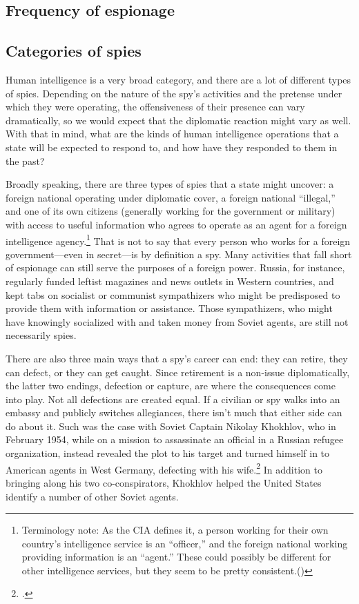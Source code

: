 \documentclass[11pt]{memoir}
\begin{document}
\begin{refsegment}
\section{Frequency of espionage}
\subsection{Categories of spies}
Human intelligence is a very broad category, and there are a lot of different types of spies. Depending on the nature of the spy's activities and the pretense under which they were operating, the offensiveness of their presence can vary dramatically, so we would expect that the diplomatic reaction might vary as well. With that in mind, what are the kinds of human intelligence operations that a state will be expected to respond to, and how have they responded to them in the past?

Broadly speaking, there are three types of spies that a state might uncover: a foreign national operating under diplomatic cover, a foreign national ``illegal,'' and one of its own citizens (generally working for the government or military) with access to useful information who agrees to operate as an agent for a foreign intelligence agency.\footnote{Terminology note: As the CIA defines it, a person working for their own country's intelligence service is an ``officer,'' and the foreign national working providing information is an ``agent.'' These could possibly be different for other intelligence services, but they seem to be pretty consistent.(\cite{cia_insider_2019})} That is not to say that every person who works for a foreign government---even in secret---is by definition a spy. Many activities that fall short of espionage can still serve the purposes of a foreign power. Russia, for instance, regularly funded leftist magazines and news outlets in Western countries, and kept tabs on socialist or communist sympathizers who might be predisposed to provide them with information or assistance. Those sympathizers, who might have knowingly socialized with and taken money from Soviet agents, are still not necessarily spies.

There are also three main ways that a spy's career can end: they can retire, they can defect, or they can get caught. Since retirement is a non-issue diplomatically, the latter two endings, defection or capture, are where the consequences come into play. Not all defections are created equal. If a civilian or spy walks into an embassy and publicly switches allegiances, there isn't much that either side can do about it. Such was the case with Soviet Captain Nikolay Khokhlov, who in February 1954, while on a mission to assassinate an official in a Russian refugee organization, instead revealed the plot to his target and turned himself in to American agents in West Germany, defecting with his wife.\footcite[Captain Khoklov repeatedly emphasized at the press conference that his decision to defect was inspired by his wife Yanina, who told him that ``she would never permit their child to have an assasin as a father.'']{handler_another_1954} In addition to bringing along his two co-conspirators, Khokhlov helped the United States identify a number of other Soviet agents.


\end{refsegment}
\end{document}

